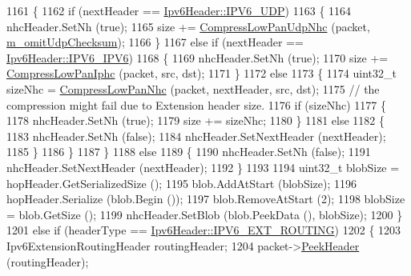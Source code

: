 \begin{DoxyCode}
1161         \{
1162           \textcolor{keywordflow}{if} (nextHeader == \hyperlink{classns3_1_1Ipv6Header_a226429221a066c5e3b1f260caf27d1e9aef42146d6b211521c22f827b04530253}{Ipv6Header::IPV6\_UDP})
1163             \{
1164               nhcHeader.SetNh (\textcolor{keyword}{true});
1165               size += \hyperlink{classns3_1_1SixLowPanNetDevice_aa163cb1c6e2c82e208692f9bae9b5189}{CompressLowPanUdpNhc} (packet, 
      \hyperlink{classns3_1_1SixLowPanNetDevice_aa3503adbbb86b19e4ec2d17f3c8436f7}{m\_omitUdpChecksum});
1166             \}
1167           \textcolor{keywordflow}{else} \textcolor{keywordflow}{if} (nextHeader == \hyperlink{classns3_1_1Ipv6Header_a226429221a066c5e3b1f260caf27d1e9a2438a09074916d0e066627b28543ec7a}{Ipv6Header::IPV6\_IPV6})
1168             \{
1169               nhcHeader.SetNh (\textcolor{keyword}{true});
1170               size += \hyperlink{classns3_1_1SixLowPanNetDevice_a67bf1501ba018d90c5bdb442371a3722}{CompressLowPanIphc} (packet, src, dst);
1171             \}
1172           \textcolor{keywordflow}{else}
1173             \{
1174               uint32\_t sizeNhc = \hyperlink{classns3_1_1SixLowPanNetDevice_a41d34fd1612e7e6911614fadfef6ab67}{CompressLowPanNhc} (packet, nextHeader, src, dst);
1175               \textcolor{comment}{// the compression might fail due to Extension header size.}
1176               \textcolor{keywordflow}{if} (sizeNhc)
1177                 \{
1178                   nhcHeader.SetNh (\textcolor{keyword}{true});
1179                   size += sizeNhc;
1180                 \}
1181               \textcolor{keywordflow}{else}
1182                 \{
1183                   nhcHeader.SetNh (\textcolor{keyword}{false});
1184                   nhcHeader.SetNextHeader (nextHeader);
1185                 \}
1186             \}
1187         \}
1188       \textcolor{keywordflow}{else}
1189         \{
1190           nhcHeader.SetNh (\textcolor{keyword}{false});
1191           nhcHeader.SetNextHeader (nextHeader);
1192         \}
1193 
1194       uint32\_t blobSize = hopHeader.GetSerializedSize ();
1195       blob.AddAtStart (blobSize);
1196       hopHeader.Serialize (blob.Begin ());
1197       blob.RemoveAtStart (2);
1198       blobSize = blob.GetSize ();
1199       nhcHeader.SetBlob (blob.PeekData (), blobSize);
1200     \}
1201   \textcolor{keywordflow}{else} \textcolor{keywordflow}{if} (headerType == \hyperlink{classns3_1_1Ipv6Header_a226429221a066c5e3b1f260caf27d1e9a4f6f9116305705bc2b3d04ff5c4bd2a8}{Ipv6Header::IPV6\_EXT\_ROUTING})
1202     \{
1203       Ipv6ExtensionRoutingHeader routingHeader;
1204       packet->\hyperlink{classns3_1_1Packet_aadc63487bea70945c418f4c3e9b81964}{PeekHeader} (routingHeader);

\end{DoxyCode}
